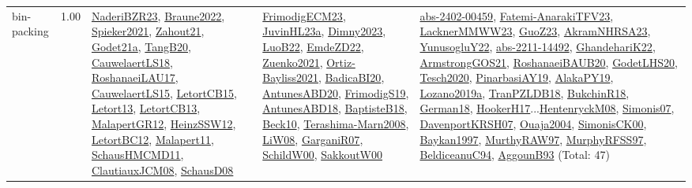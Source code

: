 {\begin{longtable}{p{3cm}r>{\raggedright\arraybackslash}p{6cm}>{\raggedright\arraybackslash}p{6cm}>{\raggedright\arraybackslash}p{8cm}}
\index{bin-packing}\index{Constraints!bin-packing}bin-packing &  1.00 & \hyperref[detail:NaderiBZR23]{NaderiBZR23}, \hyperref[detail:Braune2022]{Braune2022}, \hyperref[detail:Spieker2021]{Spieker2021}, \hyperref[detail:Zahout21]{Zahout21}, \hyperref[detail:Godet21a]{Godet21a}, \hyperref[detail:TangB20]{TangB20}, \hyperref[detail:CauwelaertLS18]{CauwelaertLS18}, \hyperref[detail:RoshanaeiLAU17]{RoshanaeiLAU17}, \hyperref[detail:CauwelaertLS15]{CauwelaertLS15}, \hyperref[detail:LetortCB15]{LetortCB15}, \hyperref[detail:Letort13]{Letort13}, \hyperref[detail:LetortCB13]{LetortCB13}, \hyperref[detail:MalapertGR12]{MalapertGR12}, \hyperref[detail:HeinzSSW12]{HeinzSSW12}, \hyperref[detail:LetortBC12]{LetortBC12}, \hyperref[detail:Malapert11]{Malapert11}, \hyperref[detail:SchausHMCMD11]{SchausHMCMD11}, \hyperref[detail:ClautiauxJCM08]{ClautiauxJCM08}, \hyperref[detail:SchausD08]{SchausD08} & \hyperref[detail:FrimodigECM23]{FrimodigECM23}, \hyperref[detail:JuvinHL23a]{JuvinHL23a}, \hyperref[detail:Dimny2023]{Dimny2023}, \hyperref[detail:LuoB22]{LuoB22}, \hyperref[detail:EmdeZD22]{EmdeZD22}, \hyperref[detail:Zuenko2021]{Zuenko2021}, \hyperref[detail:Ortiz-Bayliss2021]{Ortiz-Bayliss2021}, \hyperref[detail:BadicaBI20]{BadicaBI20}, \hyperref[detail:AntunesABD20]{AntunesABD20}, \hyperref[detail:FrimodigS19]{FrimodigS19}, \hyperref[detail:AntunesABD18]{AntunesABD18}, \hyperref[detail:BaptisteB18]{BaptisteB18}, \hyperref[detail:Beck10]{Beck10}, \hyperref[detail:Terashima-Marn2008]{Terashima-Marn2008}, \hyperref[detail:LiW08]{LiW08}, \hyperref[detail:GarganiR07]{GarganiR07}, \hyperref[detail:SchildW00]{SchildW00}, \hyperref[detail:SakkoutW00]{SakkoutW00} & \hyperref[detail:abs-2402-00459]{abs-2402-00459}, \hyperref[detail:Fatemi-AnarakiTFV23]{Fatemi-AnarakiTFV23}, \hyperref[detail:LacknerMMWW23]{LacknerMMWW23}, \hyperref[detail:GuoZ23]{GuoZ23}, \hyperref[detail:AkramNHRSA23]{AkramNHRSA23}, \hyperref[detail:YunusogluY22]{YunusogluY22}, \hyperref[detail:abs-2211-14492]{abs-2211-14492}, \hyperref[detail:GhandehariK22]{GhandehariK22}, \hyperref[detail:ArmstrongGOS21]{ArmstrongGOS21}, \hyperref[detail:RoshanaeiBAUB20]{RoshanaeiBAUB20}, \hyperref[detail:GodetLHS20]{GodetLHS20}, \hyperref[detail:Tesch2020]{Tesch2020}, \hyperref[detail:PinarbasiAY19]{PinarbasiAY19}, \hyperref[detail:AlakaPY19]{AlakaPY19}, \hyperref[detail:Lozano2019a]{Lozano2019a}, \hyperref[detail:TranPZLDB18]{TranPZLDB18}, \hyperref[detail:BukchinR18]{BukchinR18}, \hyperref[detail:German18]{German18}, \hyperref[detail:HookerH17]{HookerH17}...\hyperref[detail:HentenryckM08]{HentenryckM08}, \hyperref[detail:Simonis07]{Simonis07}, \hyperref[detail:DavenportKRSH07]{DavenportKRSH07}, \hyperref[detail:Ouaja2004]{Ouaja2004}, \hyperref[detail:SimonisCK00]{SimonisCK00}, \hyperref[detail:Baykan1997]{Baykan1997}, \hyperref[detail:MurthyRAW97]{MurthyRAW97}, \hyperref[detail:MurphyRFSS97]{MurphyRFSS97}, \hyperref[detail:BeldiceanuC94]{BeldiceanuC94}, \hyperref[detail:AggounB93]{AggounB93} (Total: 47)\\

\end{longtable}}
